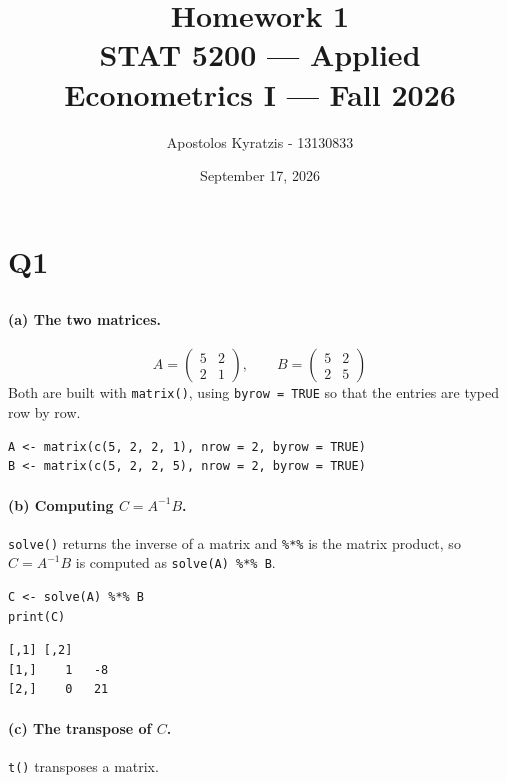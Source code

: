 \documentclass[11pt]{article}
\title{\vspace{-2em}Homework 1\\[0.3em]
       \large STAT 5200 --- Applied Econometrics I --- Fall 2026}
\author{Apostolos Kyratzis - 13130833}
\date{September 17, 2026}
\newcommand{\code}[1]{\texttt{#1}}
\begin{document}
\maketitle

\section{Q1}

\subsection{}
\label{sec:q1-matrix}

\paragraph{(a) The two matrices.}
\[
A=\begin{pmatrix} 5 & 2\\ 2 & 1 \end{pmatrix},
\qquad
B=\begin{pmatrix} 5 & 2\\ 2 & 5 \end{pmatrix}
\]
Both are built with \code{matrix()}, using \code{byrow = TRUE} so that the
entries are typed row by row.

\begin{lstlisting}[style=Rcode]
A <- matrix(c(5, 2, 2, 1), nrow = 2, byrow = TRUE)
B <- matrix(c(5, 2, 2, 5), nrow = 2, byrow = TRUE)
\end{lstlisting}

\paragraph{(b) Computing $C = A^{-1}B$.}
\code{solve()} returns the inverse of a matrix and \code{\%*\%} is the matrix
product, so $C = A^{-1}B$ is computed as \code{solve(A) \%*\% B}.

\begin{lstlisting}[style=Rcode]
C <- solve(A) %*% B
print(C)
\end{lstlisting}

\begin{lstlisting}[style=Routput]
     [,1] [,2]
[1,]    1   -8
[2,]    0   21
\end{lstlisting}

\paragraph{(c) The transpose of $C$.}
\code{t()} transposes a matrix.
\end{document}
